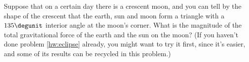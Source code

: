  Suppose that on a certain day there is a crescent moon,
and you can tell by the shape of the crescent that the
earth, sun and moon form a triangle with a $135\degunit$ interior
angle at the moon's corner. What is the magnitude of the
total gravitational force of the earth and the sun on the moon?
(If you haven't done problem \ref{hw:eclipse} already, you might
want to try it first, since it's easier, and some of its results
can be recycled in this problem.)
\answercheck
